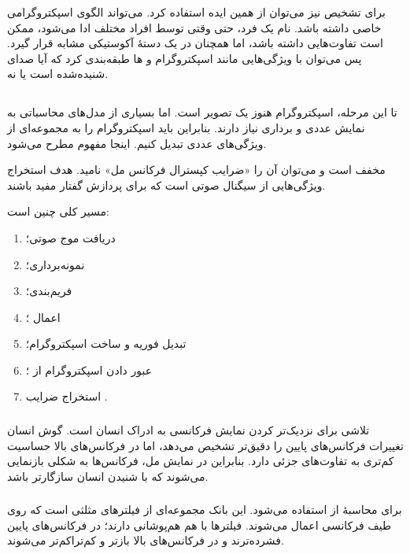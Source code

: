 برای تشخیص  نیز می‌توان از همین ایده استفاده کرد.  می‌تواند الگوی اسپکتروگرامی خاصی داشته باشد. نام یک فرد، حتی وقتی توسط افراد مختلف ادا می‌شود، ممکن است تفاوت‌هایی داشته باشد، اما همچنان در یک دستهٔ آکوستیکی مشابه قرار گیرد. پس می‌توان با ویژگی‌هایی مانند اسپکتروگرام و ها طبقه‌بندی کرد که آیا صدای شنیده‌شده  است یا نه.

\subsection{}
تا این مرحله، اسپکتروگرام هنوز یک تصویر است. اما بسیاری از مدل‌های محاسباتی به نمایش عددی و برداری نیاز دارند. بنابراین باید اسپکتروگرام را به مجموعه‌ای از ویژگی‌های عددی تبدیل کنیم. اینجا مفهوم  مطرح می‌شود.

 مخفف  است و می‌توان آن را «ضرایب کپسترال فرکانس مل» نامید. هدف  استخراج ویژگی‌هایی از سیگنال صوتی است که برای پردازش گفتار مفید باشند.

مسیر کلی چنین است:
\begin{enumerate}
    \item دریافت موج صوتی؛
    \item نمونه‌برداری؛
    \item فریم‌بندی؛
    \item اعمال ؛
    \item تبدیل فوریه و ساخت اسپکتروگرام؛
    \item عبور دادن اسپکتروگرام از ؛
    \item استخراج ضرایب .
\end{enumerate}

\subsubsection{}
 تلاشی برای نزدیک‌تر کردن نمایش فرکانسی به ادراک انسان است. گوش انسان تغییرات فرکانس‌های پایین را دقیق‌تر تشخیص می‌دهد، اما در فرکانس‌های بالا حساسیت کم‌تری به تفاوت‌های جزئی دارد. بنابراین در نمایش مل، فرکانس‌ها به شکلی بازنمایی می‌شوند که با شنیدن انسان سازگارتر باشد.

\subsubsection{}
برای محاسبهٔ  از  استفاده می‌شود. این بانک مجموعه‌ای از فیلترهای مثلثی است که روی طیف فرکانسی اعمال می‌شوند. فیلترها با هم هم‌پوشانی دارند؛ در فرکانس‌های پایین فشرده‌ترند و در فرکانس‌های بالا بازتر و کم‌تراکم‌تر می‌شوند.

